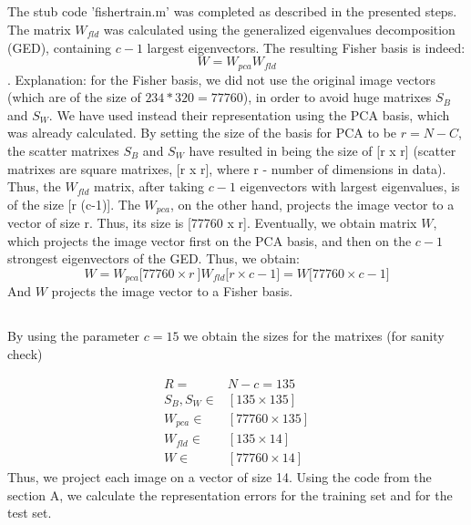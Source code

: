 \documentclass[a4paper]{iacas}
\begin{document}
\subsection{}
The stub code 'fishertrain.m' was completed as described in the presented steps. The matrix $W_{fld}$ was calculated using the generalized eigenvalues decomposition (GED), containing $c-1$ largest eigenvectors. The resulting Fisher basis is indeed: $$W=W_{pca}W_{fld}$$. Explanation: for the Fisher basis, we did not use the original image vectors (which are of the size of $234*320=77760$), in order to avoid huge matrixes $S_{B}$ and $S_{W}$. We have used instead their representation using the PCA basis, which was already calculated. By setting the size of the basis for PCA to be $r = N-C$, the scatter matrixes   $S_{B}$ and $S_{W}$  have resulted in being the size of [r x r] (scatter matrixes are square matrixes, [r x r], where r - number of dimensions in data). Thus, the $W_{fld}$ matrix, after taking $c-1$ eigenvectors with largest eigenvalues, is of the size [r (c-1)]. The $W_{pca}$, on the other hand, projects the image vector to a vector of size r. Thus, its size is [77760 x r].  Eventually, we obtain matrix $W$, which projects the image vector first on the PCA basis, and then on the $c-1$ strongest eigenvectors of the GED. Thus, we obtain:
$$W = W_{pca}{[} 77760 \times r\ {]}W_{fld}{[} r \times c-1 {]} = W{[} 77760 \times c-1 {]}$$
And $W$ projects the image vector to a Fisher basis.

\subsection{}
By using the parameter $c=15$ we obtain the sizes for the matrixes (for sanity check)

\begin{align*}
R =& N - c = 135 \\
S_{B}, S_{W} \in& [135 \times 135] \\
W_{pca} \in&  [77760 \times 135] \\
W_{fld} \in&  [135 \times 14] \\
W \in& [77760 \times 14] 
\end{align*}
Thus, we project each image on a vector of size 14. 
Using the code from the section A, we calculate the representation errors for the training set and for the test set.
\newline
\end{document}
